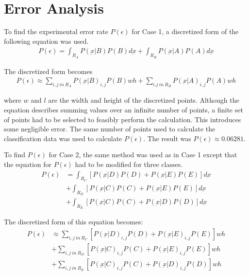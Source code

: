 \section{Error Analysis}
To find the experimental error rate $P(\epsilon)$ for Case 1, a discretized form of the following equation was used.
\begin{eqnarray}
\label{eqn:2-class_cont_PofE}
P(\epsilon)=\int_{R_A}P(\underbar {x}|B)P(B)d\underbar {x} +
            \int_{R_B}P(\underbar {x}|A)P(A)d\underbar {x}
\end{eqnarray}

The discretized form becomes
\begin{eqnarray}
\label{eqn:2-class_disc_PofE}
P(\epsilon)\approx\sum_{i,j\ in\ R_A}P(\underbar {x}|B)_{i,j}P(B)wh +
                  \sum_{i.j\ in\ R_B}P(\underbar {x}|A)_{i,j}P(A)wh
\end{eqnarray}

where $w$ and $l$ are the width and height of the discretized points. Although the equation describes summing values over an infinite number of points, a finite set of points had to be selected to feasibly perform the calculation. This introduces some negligible error. The same number of points used to calculate the classification data was used to calculate $P(\epsilon)$. The result was $P(\epsilon)\approx0.06281$.

To find $P(\epsilon)$ for Case 2, the same method was used as in Case 1 except that the equation for $P(\epsilon)$ had to be modified for three classes.
\begin{eqnarray}
\label{eqn:3-class_cont_PofE}
P(\epsilon)& = \int_{R_C}[P(\underbar{x}|D)P(D)+P(\underbar{x}|E)P(E)]d\underbar{x} \\
           & + \int_{R_D}[P(\underbar{x}|C)P(C)+P(\underbar{x}|E)P(E)]d\underbar{x} \nonumber\\
           & + \int_{R_E}[P(\underbar{x}|C)P(C)+P(\underbar{x}|D)P(D)]d\underbar{x}\nonumber
\end{eqnarray}

The discretized form of this equation becomes:
\begin{eqnarray}
\label{eqn:3-class_disc_PofE}
P(\epsilon)&\approx \sum_{i,j\ in\ R_C}[P(\underbar{x}|D)_{i,j}P(D)+P(\underbar{x}|E)_{i,j}P(E)]wh \\
           & +      \sum_{i,j\ in\ R_D}[P(\underbar{x}|C)_{i,j}P(C)+P(\underbar{x}|E)_{i,j}P(E)]wh \nonumber\\
           & +      \sum_{i,j\ in\ R_E}[P(\underbar{x}|C)_{i,j}P(C)+P(\underbar{x}|D)_{i,j}P(D)]wh \nonumber
\end{eqnarray}

